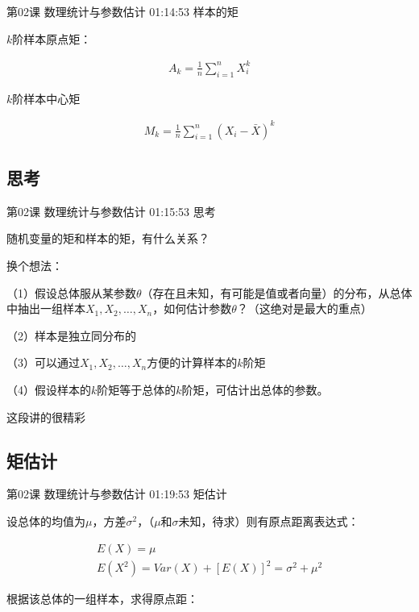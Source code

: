 \documentclass[UTF8]{ctexart}
\begin{document}
第02课 数理统计与参数估计 01:14:53 样本的矩

$k$阶样本原点矩：

\begin{equation}
\begin{aligned}
A_{k}=\frac{1}{n}\sum_{i=1}^{n}X_{i}^{k}
\end{aligned}
\end{equation}

$k$阶样本中心矩

\begin{equation}
\begin{aligned}
M_{k}=\frac{1}{n}\sum_{i=1}^{n}(X_{i}-\bar{X})^{k}
\end{aligned}
\end{equation}

\subsection{思考}

第02课 数理统计与参数估计 01:15:53 思考

随机变量的矩和样本的矩，有什么关系？

换个想法：

（1）假设总体服从某参数$\theta$（存在且未知，有可能是值或者向量）的分布，从总体中抽出一组样本$X_{1},X_{2},\dots,X_{n}$，如何估计参数$\theta$？（这绝对是最大的重点）

（2）样本是独立同分布的

（3）可以通过$X_ {1},X_{2},\dots,X_{n}$方便的计算样本的$k$阶矩

（4）假设样本的$k$阶矩等于总体的$k$阶矩，可估计出总体的参数。

这段讲的很精彩

\subsection{矩估计}

第02课 数理统计与参数估计 01:19:53 矩估计

设总体的均值为$\mu$，方差$\sigma^{2}$，（$\mu$和$\sigma$未知，待求）则有原点距离表达式：

\begin{equation}
\begin{aligned}
E(X)=\mu \\
E(X^{2})=Var(X)+[E(X)]^{2}=\sigma^{2}+\mu^{2}
\end{aligned}
\end{equation}

根据该总体的一组样本，求得原点距：
\end{document}
